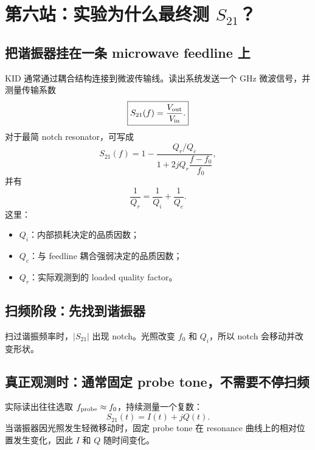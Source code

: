 \documentclass[11pt,a4paper,openany]{ctexrep}
\begin{document}
\section{第六站：实验为什么最终测 $S_{21}$？}

\subsection{把谐振器挂在一条 microwave feedline 上}
KID 通常通过耦合结构连接到微波传输线。读出系统发送一个 GHz 微波信号，并测量传输系数
\[
\boxed{S_{21}(f)=\frac{V_{\rm out}}{V_{\rm in}}.}
\]
对于最简 notch resonator，可写成
\[
S_{21}(f)=1-\frac{Q_r/Q_c}{1+2jQ_r\dfrac{f-f_0}{f_0}},
\]
并有
\[
\boxed{\frac{1}{Q_r}=\frac{1}{Q_i}+\frac{1}{Q_c}.}
\]
这里：
\begin{itemize}
  \item $Q_i$：内部损耗决定的品质因数；
  \item $Q_c$：与 feedline 耦合强弱决定的品质因数；
  \item $Q_r$：实际观测到的 loaded quality factor。
\end{itemize}

\subsection{扫频阶段：先找到谐振器}
扫过谐振频率时，$|S_{21}|$ 出现 notch。光照改变 $f_0$ 和 $Q_i$，所以 notch 会移动并改变形状。

\begin{center}
\end{center}

\subsection{真正观测时：通常固定 probe tone，不需要不停扫频}
实际读出往往选取 $f_{\rm probe}\approx f_0$，持续测量一个复数：
\[
\boxed{S_{21}(t)=I(t)+jQ(t).}
\]
当谐振器因光照发生轻微移动时，固定 probe tone 在 resonance 曲线上的相对位置发生变化，因此 $I$ 和 $Q$ 随时间变化。
\end{document}
